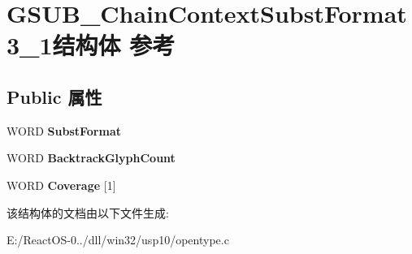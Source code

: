 \hypertarget{struct_g_s_u_b___chain_context_subst_format3__1}{}\section{G\+S\+U\+B\+\_\+\+Chain\+Context\+Subst\+Format3\+\_\+1结构体 参考}
\label{struct_g_s_u_b___chain_context_subst_format3__1}
\subsection*{Public 属性}
\begin{DoxyCompactItemize}
\item 
\mbox{\label{struct_g_s_u_b___chain_context_subst_format3__1_adc703616e4d4cc905e55098bc9d56afa}} 
W\+O\+RD {\bfseries Subst\+Format}
\item 
\mbox{\label{struct_g_s_u_b___chain_context_subst_format3__1_ae69bf063c9d172218896a81469b4a14a}} 
W\+O\+RD {\bfseries Backtrack\+Glyph\+Count}
\item 
\mbox{\label{struct_g_s_u_b___chain_context_subst_format3__1_addad6f4adad074060ca3097d6d6558da}} 
W\+O\+RD {\bfseries Coverage} \mbox{[}1\mbox{]}
\end{DoxyCompactItemize}


该结构体的文档由以下文件生成\+:\begin{DoxyCompactItemize}
\item 
E\+:/\+React\+O\+S-\/0../dll/win32/usp10/opentype.\+c\end{DoxyCompactItemize}

